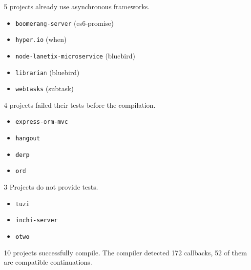 5 projects already use asynchronous frameworks.
\begin{itemize}
\item \texttt{boomerang-server} (es6-promise)
\item \texttt{hyper.io} (when)
\item \texttt{node-lanetix-microservice} (bluebird)
\item \texttt{librarian} (bluebird)
\item \texttt{webtasks} (subtask)
\end{itemize}

4 projects failed their tests before the compilation.
\begin{itemize}
\item \texttt{express-orm-mvc}
\item \texttt{hangout}
\item \texttt{derp}
\item \texttt{ord}
\end{itemize}

3 Projects do not provide tests.
\begin{itemize}
\item \texttt{tuzi}
\item \texttt{inchi-server}
\item \texttt{otwo}
\end{itemize}

10 projects successfully compile.
The compiler detected 172 callbacks, 52 of them are compatible continuations.



